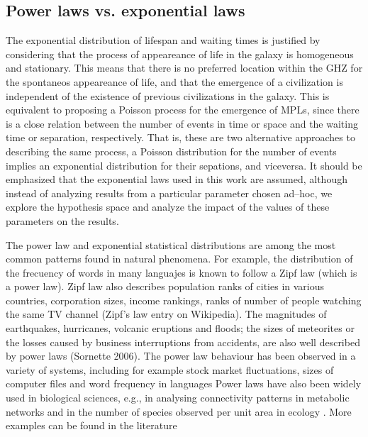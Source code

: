 \documentclass[crop]{CSLB}%
\begin{document}
\subsection{Power laws vs. exponential laws}\label{SS_PDF_shape}

The exponential distribution of lifespan and waiting times is
justified by considering that the process of appeareance of life in
the galaxy is homogeneous and stationary.
%
This means that there is no preferred location within the GHZ for the
spontaneos appeareance of life, and that the emergence of a
civilization is independent of the existence of previous civilizations 
in the galaxy.
%            
This is equivalent to proposing a Poisson process for the emergence of
MPLs, since there is a close relation between the number of events in
time or space and the waiting time or separation, respectively.
%
That is, these are two alternative approaches to describing the same
process, a Poisson distribution for the number of events implies an
exponential distribution for their sepations, and viceversa.
%
It should be emphasized that the exponential laws used in this work
are assumed, although instead of analyzing results from a particular
parameter chosen ad--hoc, we explore the hypothesis space and analyze
the impact of the values of these parameters on the results.
%                                                           

The power law and exponential statistical distributions are among the
most common patterns found in natural phenomena.
%
For example, the distribution of the frecuency of words in many
languajes is known to follow a Zipf law (which is a power law).
%
Zipf law also describes population ranks of cities in various
countries, corporation sizes, income rankings, ranks of number of
people watching the same TV channel (Zipf's law entry on Wikipedia).
%
The magnitudes of earthquakes, hurricanes, volcanic eruptions and
floods; the sizes of meteorites or the losses caused by business
interruptions from accidents, are also well described by power laws
(Sornette 2006).
%
The power law behaviour has been observed in a variety of systems,
including for example stock market fluctuations, sizes of computer
files and word frequency in languages \citep{mitzenmacher_brief_2004,
newman_power_2005, simkin_theory_2006}
%
Power laws have also been widely used in biological sciences, e.g., in
analysing connectivity patterns in metabolic networks
\citep{jeong_large_2000} and in the number of species observed per
unit area in ecology \citep{martin_origin_2006, frank_common_2009}.
% 
More examples can be found in the literature
\citep{martin_origin_2006, maccone_KLT_2010, barabasi_scale_2009,
maccone_evolution_2014, maccone_lognormals_2014,
benguigui_classificacion_2016}
 
\end{document}
